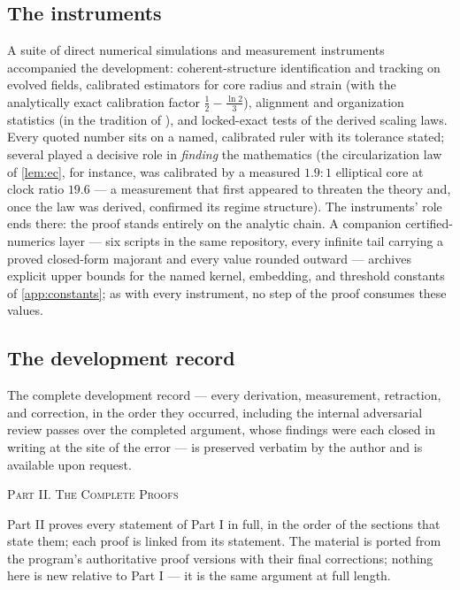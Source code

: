 \documentclass[11pt,letterpaper]{amsart}
\theoremstyle{definition}
\theoremstyle{remark}
\begin{document}
\subsection{The instruments}\label{subsec:instruments}
A suite of direct numerical simulations and measurement instruments accompanied the
development: coherent-structure identification and tracking on evolved fields,
calibrated estimators for core radius and strain (with the analytically exact
calibration factor $\tfrac12-\tfrac{\ln2}{3}$), alignment and organization
statistics (in the tradition of \cite{Ashurst1987}), and locked-exact tests of the
derived scaling laws. Every quoted number
sits on a named, calibrated ruler with its tolerance stated; several played a
decisive role in \emph{finding} the mathematics (the circularization law of
\cref{lem:ec}, for instance, was calibrated by a measured $1.9{:}1$ elliptical core at
clock ratio $19.6$ --- a measurement that first appeared to threaten the theory and,
once the law was derived, confirmed its regime structure). The instruments' role ends
there: the proof stands entirely on the analytic chain. A companion
certified-numerics layer --- six scripts in the same repository, every infinite
tail carrying a proved closed-form majorant and every value rounded outward ---
archives explicit upper bounds for the named kernel, embedding, and threshold
constants of \cref{app:constants}; as with every instrument, no step of the
proof consumes these values.

\subsection{The development record}\label{subsec:record}
The complete development record --- every derivation, measurement, retraction, and
correction, in the order they occurred, including the internal adversarial review
passes over the completed argument, whose findings were each closed in writing at the
site of the error --- is preserved verbatim by the author and is available upon
request.

\newpage
\begin{center}
{\large\scshape Part II. The Complete Proofs}\medskip

\begin{minipage}{0.86\textwidth}\small
Part II proves every statement of Part I in full, in the order of the sections that
state them; each proof is linked from its statement. The material is ported from the
program's authoritative proof versions with their final corrections; nothing here is
new relative to Part I --- it is the same argument at full length.
\end{minipage}
\end{center}
\bigskip
\end{document}
